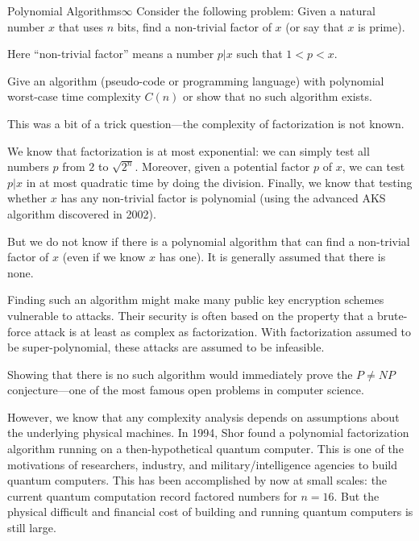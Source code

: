 \documentclass[a4paper]{article}
\begin{document}
\begin{problem}{Polynomial Algorithms}{$\infty$}
Consider the following problem: Given a natural number $x$ that uses $n$ bits, find a non-trivial factor of $x$ (or say that $x$ is prime).

Here ``non-trivial factor'' means a number $p|x$ such that $1<p<x$.

Give an algorithm (pseudo-code or programming language) with polynomial worst-case time complexity $C(n)$ or show that no such algorithm exists.

\begin{solution}
This was a bit of a trick question---the complexity of factorization is not known.

We know that factorization is at most exponential: we can simply test all numbers $p$ from $2$ to $\sqrt{2^n}$.
Moreover, given a potential factor $p$ of $x$, we can test $p|x$ in at most quadratic time by doing the division.
Finally, we know that testing whether $x$ has any non-trivial factor is polynomial (using the advanced AKS algorithm discovered in 2002).

But we do not know if there is a polynomial algorithm that can find a non-trivial factor of $x$ (even if we know $x$ has one).
It is generally assumed that there is none.
\medskip

Finding such an algorithm might make many public key encryption schemes vulnerable to attacks.
Their security is often based on the property that a brute-force attack is at least as complex as factorization.
With factorization assumed to be super-polynomial, these attacks are assumed to be infeasible.

Showing that there is no such algorithm would immediately prove the $P\neq NP$ conjecture---one of the most famous open problems in computer science.
\medskip

However, we know that any complexity analysis depends on assumptions about the underlying physical machines.
In 1994, Shor found a polynomial factorization algorithm running on a then-hypothetical quantum computer.
This is one of the motivations of researchers, industry, and military/intelligence agencies to build quantum computers.
This has been accomplished by now at small scales: the current quantum computation record factored numbers for $n=16$.
But the physical difficult and financial cost of building and running quantum computers is still large.
\end{solution}
\end{problem}
\end{document}

